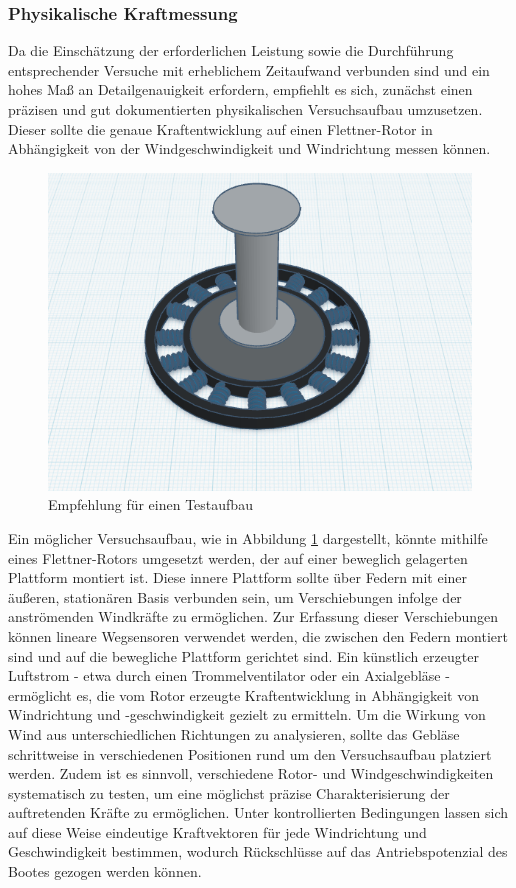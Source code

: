 \documentclass[a4paper,12pt]{article}
\begin{document}
\subsubsection{Physikalische Kraftmessung}
Da die Einschätzung der erforderlichen Leistung sowie die Durchführung entsprechender Versuche mit erheblichem Zeitaufwand verbunden sind und ein hohes Maß an Detailgenauigkeit erfordern, empfiehlt es sich, zunächst einen präzisen und gut dokumentierten physikalischen Versuchsaufbau umzusetzen. Dieser sollte die genaue Kraftentwicklung auf einen Flettner-Rotor in Abhängigkeit von der Windgeschwindigkeit und Windrichtung messen können. 
\begin{figure}[H]
    \centering
    \includegraphics[width=0.7\linewidth]{images/Empfehlungsaufbau.png}
    \caption{Empfehlung für einen Testaufbau}
    \label{fig:Empfehlungsaufbau}
\end{figure}
Ein möglicher Versuchsaufbau, wie in Abbildung \ref{fig:Empfehlungsaufbau} dargestellt, könnte mithilfe eines Flettner-Rotors umgesetzt werden, der auf einer beweglich gelagerten Plattform montiert ist. Diese innere Plattform sollte über Federn mit einer äußeren, stationären Basis verbunden sein, um Verschiebungen infolge der anströmenden Windkräfte zu ermöglichen. \newline
Zur Erfassung dieser Verschiebungen können lineare Wegsensoren verwendet werden, die zwischen den Federn montiert sind und auf die bewegliche Plattform gerichtet sind. Ein künstlich erzeugter Luftstrom - etwa durch einen Trommelventilator oder ein Axialgebläse - ermöglicht es, die vom Rotor erzeugte Kraftentwicklung in Abhängigkeit von Windrichtung und -geschwindigkeit gezielt zu ermitteln.
Um die Wirkung von Wind aus unterschiedlichen Richtungen zu analysieren, sollte das Gebläse schrittweise in verschiedenen Positionen rund um den Versuchsaufbau platziert werden. Zudem ist es sinnvoll, verschiedene Rotor- und Windgeschwindigkeiten systematisch zu testen, um eine möglichst präzise Charakterisierung der auftretenden Kräfte zu ermöglichen.
Unter kontrollierten Bedingungen lassen sich auf diese Weise eindeutige Kraftvektoren für jede Windrichtung und Geschwindigkeit bestimmen, wodurch Rückschlüsse auf das Antriebspotenzial des Bootes gezogen werden können.
\end{document}
